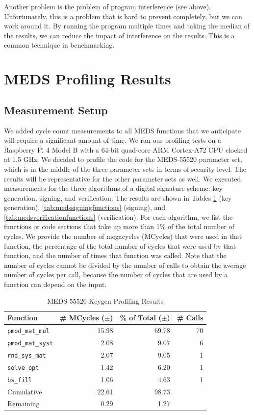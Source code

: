 \documentclass[11pt,a4paper]{report}
\theoremstyle{definition}
\begin{document}
Another problem is the problem of program interference (see above). Unfortunately, this is a problem that is hard to prevent completely, but we can work around it. By running the program multiple times and taking the median of the results, we can reduce the impact of interference on the results. This is a common technique in benchmarking.

\section{MEDS Profiling Results}
\label{sec:medsprofilingresults}

\subsection{Measurement Setup}
We added cycle count measurements to all MEDS functions that we anticipate will require a significant amount of time. We ran our profiling tests on a Raspberry Pi 4 Model B with a 64-bit quad-core ARM Cortex-A72 CPU clocked at 1.5 GHz. We decided to profile the code for the MEDS-55520 parameter set, which is in the middle of the three parameter sets in terms of security level. The results will be representative for the other parameter sets as well. We executed measurements for the three algorithms of a digital signature scheme: key generation, signing, and verification. The results are shown in Tables \ref{tab:medskeygenfunctions} (key generation), \ref{tab:medssigningfunctions} (signing), and \ref{tab:medsverificationfunctions} (verification). For each algorithm, we list the functions or code sections that take up more than 1\% of the total number of cycles. We provide the number of megacycles (MCycles) that were used in that function, the percentage of the total number of cycles that were used by that function, and the number of times that function was called. Note that the number of cycles cannot be divided by the number of calls to obtain the average number of cycles per call, because the number of cycles that are used by a function can depend on the input.

\begin{table}[]
  \centering
  \begin{tabular}{lrrr}
    \toprule
    \textbf{Function} & \textbf{\# MCycles} ($\pm$) & \textbf{\% of Total} ($\pm$) & \textbf{\# Calls} \\
    \midrule
      \texttt{pmod\_mat\_mul} & 15.98 & 69.78 & 70 \\
      \texttt{pmod\_mat\_syst} & 2.08 & 9.07 & 6 \\
      \texttt{rnd\_sys\_mat} & 2.07 & 9.05 & 1 \\
      \texttt{solve\_opt} & 1.42 & 6.20 & 1 \\
      \texttt{bs\_fill} & 1.06 & 4.63 & 1 \\
    \midrule
      Cumulative & 22.61 & 98.73 & \\
      Remaining & 0.29 & 1.27 & \\
    \bottomrule
  \end{tabular}
  \caption{MEDS-55520 Keygen Profiling Results}
  \label{tab:medskeygenfunctions}
\end{table}
\end{document}
